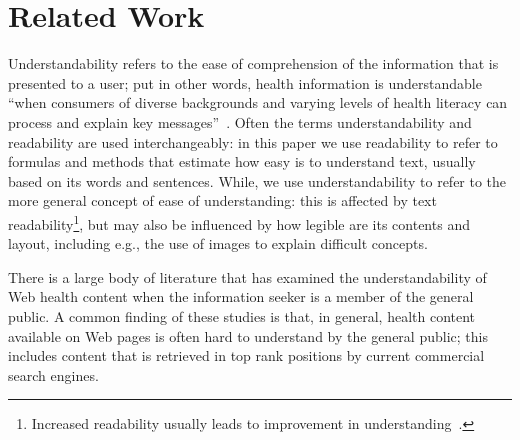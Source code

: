 %
%

\section{Related Work}
\label{sec:related}
Understandability refers to the ease of comprehension of the information that is presented to a user; put in other words, health information is understandable ``when consumers of diverse backgrounds and varying levels of health literacy can process and explain key messages''~\cite{shoemaker2014development}. Often the terms understandability and readability are used interchangeably: in this paper we use readability to refer to formulas and methods that estimate how easy is to understand text, usually based on its words and sentences. While, we use understandability to refer to the more general concept of ease of understanding: this is affected by text readability\footnote{Increased readability usually leads to improvement in understanding~\cite{ley1996use}.}, but may also be influenced by how legible are its contents and layout, including e.g., the use of images to explain difficult concepts.

There is a large body of literature that has examined the understandability of Web health content when the information seeker is a member of the general public. 
A common finding of these studies is that, in general, health content available on Web pages is often hard to understand by the general public; this includes content that is retrieved in top rank positions by current commercial search engines.


